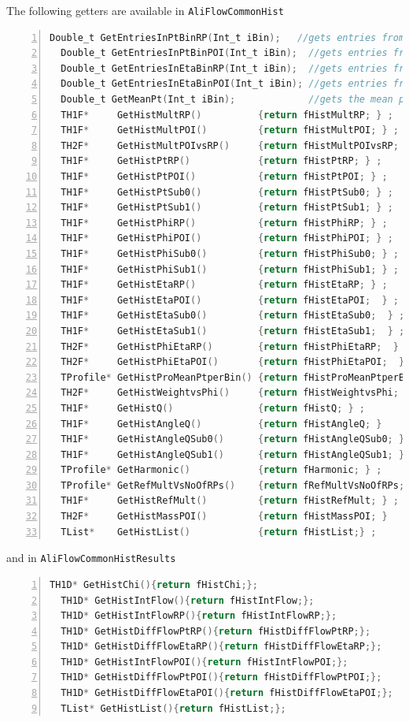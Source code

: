 \documentclass[a4paper]{book}
\numberwithin{equation}{subsection}
\begin{document}
 The following getters are available in \texttt{AliFlowCommonHist}
 \begin{lstlisting}[language=C, numbers=left]
  Double_t GetEntriesInPtBinRP(Int_t iBin);   //gets entries from fHistPtRP
  Double_t GetEntriesInPtBinPOI(Int_t iBin);  //gets entries from fHistPtPOI
  Double_t GetEntriesInEtaBinRP(Int_t iBin);  //gets entries from fHistEtaRP
  Double_t GetEntriesInEtaBinPOI(Int_t iBin); //gets entries from fHistEtaPOI
  Double_t GetMeanPt(Int_t iBin);             //gets the mean pt for this bin from fHistProMeanPtperBin   
  TH1F*     GetHistMultRP()          {return fHistMultRP; } ;  
  TH1F*     GetHistMultPOI()         {return fHistMultPOI; } ; 
  TH2F*     GetHistMultPOIvsRP()     {return fHistMultPOIvsRP; } ;
  TH1F*     GetHistPtRP()            {return fHistPtRP; } ;  
  TH1F*     GetHistPtPOI()           {return fHistPtPOI; } ;
  TH1F*     GetHistPtSub0()          {return fHistPtSub0; } ;
  TH1F*     GetHistPtSub1()          {return fHistPtSub1; } ;
  TH1F*     GetHistPhiRP()           {return fHistPhiRP; } ;  
  TH1F*     GetHistPhiPOI()          {return fHistPhiPOI; } ;  
  TH1F*     GetHistPhiSub0()         {return fHistPhiSub0; } ; 
  TH1F*     GetHistPhiSub1()         {return fHistPhiSub1; } ; 
  TH1F*     GetHistEtaRP()           {return fHistEtaRP; } ;  
  TH1F*     GetHistEtaPOI()          {return fHistEtaPOI;  } ;  
  TH1F*     GetHistEtaSub0()         {return fHistEtaSub0;  } ; 
  TH1F*     GetHistEtaSub1()         {return fHistEtaSub1;  } ; 
  TH2F*     GetHistPhiEtaRP()        {return fHistPhiEtaRP;  } ; 
  TH2F*     GetHistPhiEtaPOI()       {return fHistPhiEtaPOI;  } ; 
  TProfile* GetHistProMeanPtperBin() {return fHistProMeanPtperBin; } ;
  TH2F*     GetHistWeightvsPhi()     {return fHistWeightvsPhi; } ;
  TH1F*     GetHistQ()               {return fHistQ; } ;  
  TH1F*     GetHistAngleQ()          {return fHistAngleQ; }
  TH1F*     GetHistAngleQSub0()      {return fHistAngleQSub0; }
  TH1F*     GetHistAngleQSub1()      {return fHistAngleQSub1; }
  TProfile* GetHarmonic()            {return fHarmonic; } ; 
  TProfile* GetRefMultVsNoOfRPs()    {return fRefMultVsNoOfRPs; } ;
  TH1F*     GetHistRefMult()         {return fHistRefMult; } ; 
  TH2F*     GetHistMassPOI()         {return fHistMassPOI; }
  TList*    GetHistList()            {return fHistList;} ;  \end{lstlisting}
  and in \texttt{AliFlowCommonHistResults}
  \begin{lstlisting}[language=C, numbers=left]
  TH1D* GetHistChi(){return fHistChi;};
  TH1D* GetHistIntFlow(){return fHistIntFlow;};    
  TH1D* GetHistIntFlowRP(){return fHistIntFlowRP;}; 
  TH1D* GetHistDiffFlowPtRP(){return fHistDiffFlowPtRP;}; 
  TH1D* GetHistDiffFlowEtaRP(){return fHistDiffFlowEtaRP;}; 
  TH1D* GetHistIntFlowPOI(){return fHistIntFlowPOI;};
  TH1D* GetHistDiffFlowPtPOI(){return fHistDiffFlowPtPOI;}; 
  TH1D* GetHistDiffFlowEtaPOI(){return fHistDiffFlowEtaPOI;}; 
  TList* GetHistList(){return fHistList;};  \end{lstlisting}
 
\end{document}

